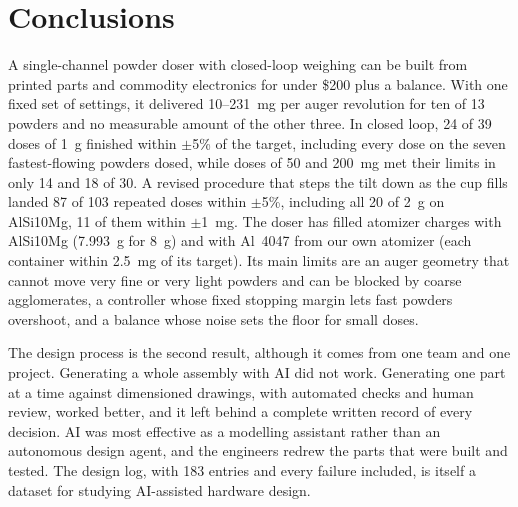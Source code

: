 \documentclass[twoside,twocolumn,9pt]{article}
\begin{document}
\section{Conclusions}

A single-channel powder doser with closed-loop weighing can be built from printed parts and commodity electronics for under \$200 plus a balance. With one fixed set of settings, it delivered 10--231~mg per auger revolution for ten of 13 powders and no measurable amount of the other three. In closed loop, 24 of 39 doses of 1~g finished within $\pm$5\% of the target, including every dose on the seven fastest-flowing powders dosed, while doses of 50 and 200~mg met their limits in only 14 and 18 of 30. A revised procedure that steps the tilt down as the cup fills landed 87 of 103 repeated doses within $\pm$5\%, including all 20 of 2~g on AlSi10Mg, 11 of them within $\pm$1~mg. The doser has filled atomizer charges with AlSi10Mg (7.993~g for 8~g) and with Al~4047 from our own atomizer (each container within 2.5~mg of its target). Its main limits are an auger geometry that cannot move very fine or very light powders and can be blocked by coarse agglomerates, a controller whose fixed stopping margin lets fast powders overshoot, and a balance whose noise sets the floor for small doses.

The design process is the second result, although it comes from one team and one project. Generating a whole assembly with AI did not work. Generating one part at a time against dimensioned drawings, with automated checks and human review, worked better, and it left behind a complete written record of every decision. AI was most effective as a modelling assistant rather than an autonomous design agent, and the engineers redrew the parts that were built and tested. The design log, with 183 entries and every failure included, is itself a dataset for studying AI-assisted hardware design.
\end{document}
